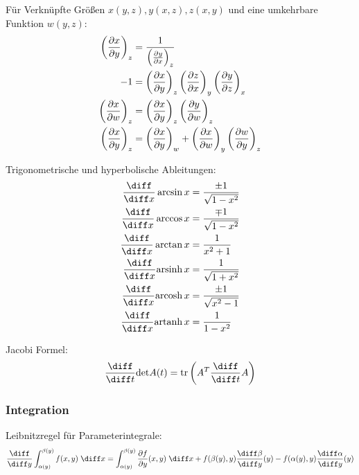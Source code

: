 \documentclass[11pt]{article}
\numberwithin{equation}{section}
\begin{document}
        Für Verknüpfte Größen $x(y,z), y(x,z), z(x,y)$ und eine umkehrbare Funktion $w(y,z)$:
        \begin{equation}
          \begin{aligned}
            \left( \frac{\partial x}{\partial y} \right)_z &= \frac{1}{\left( \frac{\partial y}{\partial x} \right)_z} \\
            -1 &= \left( \frac{\partial x}{\partial y} \right)_z \left( \frac{\partial z}{\partial x} \right)_y \left( \frac{\partial y}{\partial z} \right)_x \\
            \left( \frac{\partial x}{\partial w} \right)_z &= \left( \frac{\partial x}{\partial y} \right)_z \left( \frac{\partial y}{\partial w} \right)_z \\
            \left( \frac{\partial x}{\partial y} \right)_z &= \left( \frac{\partial x}{\partial y} \right)_w + \left( \frac{\partial x}{\partial w} \right)_y \left( \frac{\partial w}{\partial y} \right)_z \\
          \end{aligned}
        \end{equation}

				Trigonometrische und hyperbolische Ableitungen:
				\begin{equation}
					\begin{split}
						\frac{\diff}{\diff x}\arcsin x &= \frac{\pm 1}{\sqrt{1-x^2}} \\
						\frac{\diff}{\diff x}\arccos x &= \frac{\mp 1}{\sqrt{1-x^2}} \\
						\frac{\diff}{\diff x}\arctan x &= \frac{1}{x^2+1} \\
						\frac{\diff}{\diff x}\mathrm{arsinh}\,x &= \frac{1}{\sqrt{1+x^2}} \\
						\frac{\diff}{\diff x}\mathrm{arcosh}\,x &= \frac{\pm 1}{\sqrt{x^2-1}} \\
						\frac{\diff}{\diff x}\mathrm{artanh}\,x &= \frac{1}{1-x^2} \\
					\end{split}
				\end{equation}

        Jacobi Formel:
        \begin{equation}
          \tder{}{t}\mathrm{det} A(t) = \mathrm{tr}\left(A^T \tder{}{t} A\right)
        \end{equation}

  		\subsubsection{Integration}
        Leibnitzregel für Parameterintegrale:
        \begin{equation}
          \tder{}{y} \int_{\alpha(y)}^{\beta(y)}f(x,y)\;\diff x = \int_{\alpha(y)}^{\beta(y)} \pder{f}{y}(x,y)\;\diff x + f(\beta(y),y)\tder{\beta}{y}(y)-f(\alpha(y),y)\tder{\alpha}{y}(y)
        \end{equation}
\end{document}
